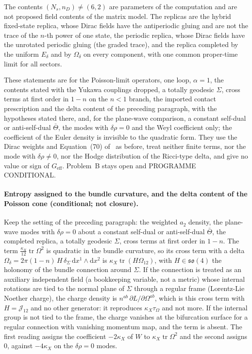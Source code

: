 The contents \((N_s,n_D)\neq(6,2)\) are parameters of the computation and are not proposed field contents of the matrix model. The replicas are the hybrid fixed-state replica, whose Dirac fields have the antiperiodic gluing and are not the trace of the \(n\)-th power of one state, the periodic replica, whose Dirac fields have the unrotated periodic gluing (the graded trace), and the replica completed by the uniform \(E_\delta\) and by \(\Omega_\delta\) on every component, with one common proper-time limit for all sectors.

These statements are for the Poisson-limit operators, one loop, \(\alpha=1\), the contents stated with the Yukawa couplings dropped, a totally geodesic \(\Sigma\), cross terms at first order in \(1-n\) on the \(n<1\) branch, the imported contact prescription and the delta content of the preceding paragraph, with the hypotheses stated there, and, for the plane-wave comparison, a constant self-dual or anti-self-dual \(\bar\Theta\), the modes with \(\delta\rho=0\) and the Weyl coefficient only; the coefficient of the Euler density is invisible to the quadratic form. They use the Dirac weights and Equation~(70) of~\cite{Solodukhin2011} as before, treat neither finite terms, nor the mode with \(\delta\rho\neq0\), nor the Hodge distribution of the Ricci-type delta, and give no value or sign of \(G_{\mathrm{eff}}\). Problem~B stays open and PROGRAMME CONDITIONAL.

\paragraph{Entropy assigned to the bundle curvature, and the delta content of the Poisson cone (conditional; not closure).}
Keep the setting of the preceding paragraph: the weighted \(a_2\) density, the plane-wave modes with \(\delta\rho=0\) about a constant self-dual or anti-self-dual \(\bar\Theta\), the completed replica, a totally geodesic \(\Sigma\), cross terms at first order in \(1-n\). The term \(\tfrac{\kappa_X}{12}\operatorname{tr}\Omega^2\) is quadratic in the bundle curvature, so its cross term with a delta \(\Omega_\delta=2\pi(1-n)\,H\,\delta_\Sigma\,\mathrm dx^1\wedge\mathrm dx^2\) is \(\kappa_X\operatorname{tr}(H\Omega_{12})\), with \(H\in\mathfrak{so}(4)\) the holonomy of the bundle connection around \(\Sigma\). If the connection is treated as an auxiliary independent field (a bookkeeping variable, not a metric) whose internal rotations are tied to the normal plane of \(\Sigma\) through a regular frame (Lorentz-Lie Noether charge), the charge density is \(n^{ab}\,\partial L/\partial\Omega^{ab}\), which is this cross term with \(H=\mathcal J_{12}\) and no other generator: it reproduces \(\kappa_X\tau_\Omega\) and not more. If the internal group is not tied to the frame, the charge vanishes at the bifurcation surface for a regular connection with vanishing momentum map, and the term is absent. The first reading assigns the coefficient \(-2\kappa_X\) of \(W\) to \(\kappa_X\operatorname{tr}\Omega^2\) and the second assigns \(0\), against \(-4\kappa_X\) on the \(\delta\rho=0\) modes.

